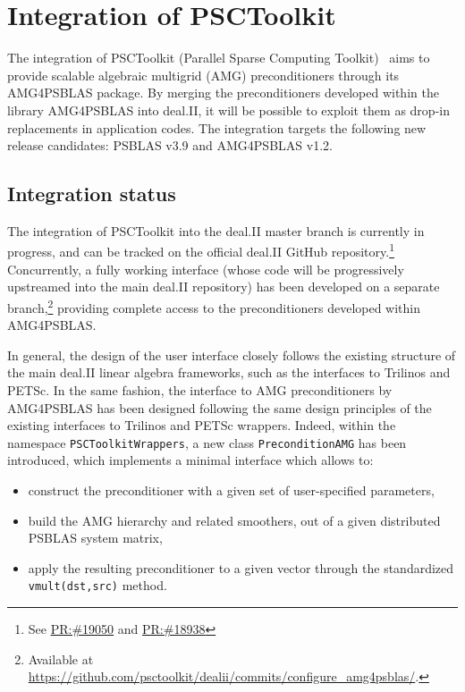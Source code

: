 \documentclass[a4paper,12pt]{article}
\newcommand{\pr}[1]{\href{https://github.com/dealii/dealii/pull/#1}{PR:\##1}}
\begin{document}
\newpage

\section{{Integration of PSCToolkit}}
\label{sec:section5}

The integration of PSCToolkit (Parallel Sparse Computing Toolkit)~\cite{psctoolkit} aims to provide scalable algebraic
multigrid (AMG) preconditioners through its AMG4PSBLAS package. By merging the preconditioners developed within the library AMG4PSBLAS
into deal.II, it will be possible to exploit them as drop-in replacements in application codes. The integration
targets the following new release candidates: PSBLAS v3.9 and AMG4PSBLAS v1.2.

\subsection{Integration status}
The integration of PSCToolkit into the deal.II master branch is currently in progress, and can be tracked on the
official deal.II GitHub repository.\footnote{See \pr{19050} and \pr{18938}} Concurrently, a fully working interface (whose code will be progressively upstreamed into the main deal.II repository) has been developed on a separate
branch,\footnote{Available at \url{https://github.com/psctoolkit/dealii/commits/configure_amg4psblas/}.} providing complete access
to the preconditioners developed within AMG4PSBLAS.

In general, the design of the user interface closely follows the existing structure of the main deal.II linear algebra frameworks, such as the
interfaces to Trilinos and PETSc. In the same fashion, the interface to AMG preconditioners by AMG4PSBLAS has been designed following the same design
principles of the existing interfaces to Trilinos and PETSc wrappers. Indeed, within the namespace \texttt{PSCToolkitWrappers}, a new class \texttt{PreconditionAMG} has been introduced, which implements
a minimal interface which allows to:
\begin{itemize}
    \item construct the preconditioner with a given set of user-specified parameters,
    \item build the AMG hierarchy and related smoothers, out of a given distributed PSBLAS system matrix,
    \item apply the resulting preconditioner to a given vector through the standardized \texttt{vmult(dst,src)} method.
\end{itemize}
\end{document}
